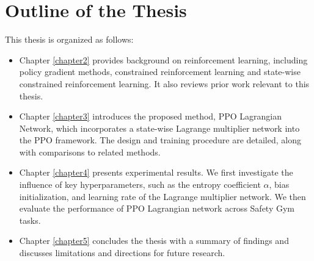 \section{Outline of the Thesis}

This thesis is organized as follows:

\begin{itemize}
  \item Chapter \ref{chapter2} provides background on reinforcement learning, including policy gradient methods, constrained reinforcement learning and state-wise constrained reinforcement learning. It also reviews prior work relevant to this thesis.
  \item Chapter \ref{chapter3} introduces the proposed method, PPO Lagrangian Network, which incorporates a state-wise Lagrange multiplier network into the PPO framework. The design and training procedure are detailed, along with comparisons to related methods.
  \item Chapter \ref{chapter4} presents experimental results. We first investigate the influence of key hyperparameters, such as the entropy coefficient $\alpha$, bias initialization, and learning rate of the Lagrange multiplier network. We then evaluate the performance of PPO Lagrangian network across Safety Gym tasks.
  \item Chapter \ref{chapter5} concludes the thesis with a summary of findings and discusses limitations and directions for future research.
\end{itemize}
